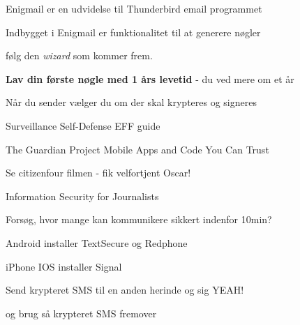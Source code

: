 \documentclass[20pt,landscape,a4paper,footrule]{foils}
\begin{document}


Enigmail er en udvidelse til Thunderbird email programmet\\ 



\begin{list2}
\item Indbygget i Enigmail er funktionalitet til at generere nøgler
\item følg den \emph{wizard} som kommer frem.
\item {\bf Lav din første nøgle med 1 års levetid} - du ved mere om et år \smiley
\end{list2}




Når du sender vælger du om der skal krypteres og signeres


\myquestionspage



\begin{list2}
\item Surveillance Self-Defense EFF guide
\item The Guardian Project Mobile Apps and Code You Can Trust\\
\item Se citizenfour filmen - fik velfortjent Oscar!\\ {\footnotesize{}}
\item Information Security for Journalists\\
\end{list2}



Forsøg, hvor mange kan kommunikere sikkert indenfor 10min?

\begin{list2}
\item Android installer TextSecure og Redphone
\item iPhone IOS installer Signal
\end{list2}

\vskip 1cm
\centerline{Send krypteret SMS til en anden herinde og sig YEAH!}

og brug så krypteret SMS fremover \smiley
\end{document}
